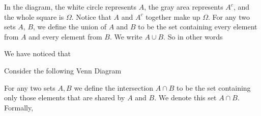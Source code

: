\noindent In the diagram, the white circle represents $A$, the gray area represents $A^c$, and the whole square is $\Omega$. Notice that $A$ and $A^c$ together make up $\Omega$. For any two sets $A$, $B$, we define the union \label{union} of $A$ and $B$ to be the set containing every element from $A$ and every element from $B$. We write $A \cup B$. \label{symbcup} So in other words
	\bigskip
	
	\hfil{}
	\bigskip
 
We have noticed that

	\bigskip
	
	\hfil{}
	\bigskip



Consider the following Venn Diagram
	\begin{figure}[h!]
	\centering
	\end{figure}

For any two sets $A,B$ we define the intersection \label{intersection} $A \cap B$ to be the set containing only those elements that are shared by $A$ and $B$. We denote this set $A \cap B$. Formally, \label{symbcap}
\bigskip

\hfil{}
\bigskip

